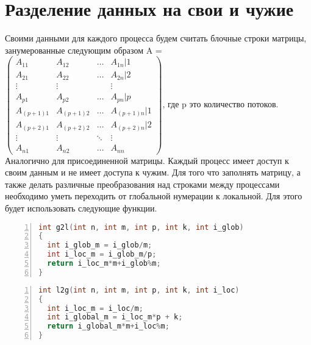 \documentclass[12pt, a4paper]{article}
\begin{document}
\section{Разделение данных на свои и чужие}
Своими данными для каждого процесса будем считать блочные строки матрицы, занумерованные следующим образом A = $\begin{pmatrix}
     A_{11}& A_{12} &\ldots & A_{1n} | 1\\
     \hline
     A_{21}& A_{22} &\ldots & A_{2n}| 2\\
     \hline
     \vdots& \vdots && \vdots\\
     \hline
     A_{p1}& A_{p2} &\ldots & A_{pn}|p\\
     \hline
     A_{(p+1)1}& A_{(p+1)2} &\ldots & A_{(p+1)n}|1\\
     \hline
      A_{(p+2)1}& A_{(p+2)2} &\ldots & A_{(p+2)n}|2\\
     \vdots& \vdots &\ddots & \vdots\\
     A_{n1}& A_{n2} &\ldots & A_{nn}    
    \end{pmatrix}$, где p это количество потоков. Аналогично для присоединенной матрицы. Каждый процесс имеет доступ к своим данным и не имеет доступа к чужим. Для того что заполнять матрицу, а также делать различные преобразования над строками между процессами необходимо уметь переходить от глобальной нумерации к локальной. Для этого будет использовать следующие функции.
    \begin{lstlisting}[language=C++,
tabsize=2,
stepnumber=1,
numbers=left,
 commentstyle=\itshape \color{TRE},
backgroundcolor=\color{backcolour},
basicstyle=\ttfamily\small,
frame=single,
breaklines=true,   
breakatwhitespace=true,
emphstyle=\itshape,
keywordstyle=\color{blue} ]
int g2l(int n, int m, int p, int k, int i_glob)
{
  int i_glob_m = i_glob/m;
  int i_loc_m = i_glob_m/p;
  return i_loc_m*m+i_glob%m;
}
\end{lstlisting}
\begin{lstlisting}[language=C++,
tabsize=2,
stepnumber=1,
numbers=left,
 commentstyle=\itshape \color{TRE},
backgroundcolor=\color{backcolour},
basicstyle=\ttfamily\small,
frame=single,
breaklines=true,   
breakatwhitespace=true,
emphstyle=\itshape,
keywordstyle=\color{blue} ]
int l2g(int n, int m, int p, int k, int i_loc)
{
  int i_loc_m = i_loc/m;
  int i_global_m = i_loc_m*p + k;
  return i_global_m*m+i_loc%m;
}
\end{lstlisting}
\end{document}
